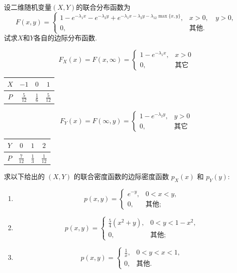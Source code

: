 \documentclass[../main.tex]{subfiles}
\begin{document}
\begin{exercise}{}{}
设二维随机变量$(X,Y)$的联合分布函数为
\[
F(x,y) =
\begin{cases}
1 - e^{-\lambda_1 x} - e^{-\lambda_2 y} + e^{-\lambda_1 x - \lambda_2 y - \lambda_{12} \max\{x,y\}}, & x > 0, \quad y > 0, \\
0, & \text{其他}.
\end{cases}
\]
试求$X$和$Y$各自的边际分布函数.
\end{exercise}
\begin{solution}
    
\[
F_{X}\left( x \right)= F\left( x,\infty \right)= \begin{cases} 1-e^{- \lambda _1 x},&x> 0\\ 
 0,&\text{其它} \end{cases}   
\]\begin{center}
\begin{tabular}{|c|c|c|c|}
\hline
\(X\) & \(-1\) & \(0\) & \(1\) \\
\hline
\(P\) & \(\frac{5}{12}\) & \(\frac{1}{6}\) & \(\frac{5}{12}\) \\
\hline
\end{tabular}
\end{center}
 \[
F_{Y}\left( x \right)= F\left( \infty,y \right)= \begin{cases} 1-e^{- \lambda _2 y},&y> 0\\ 
 0,&\text{其它} \end{cases}   
\]
\begin{center}
\begin{tabular}{|c|c|c|c|}
\hline
\(Y\) & \(0\) & \(1\) & \(2\) \\
\hline
\(P\) & \(\frac{7}{12}\) & \(\frac{1}{3}\) & \(\frac{1}{12}\) \\
\hline
\end{tabular}
\end{center}

\end{solution}

\begin{exercise}{}{}
求以下给出的 $(X,Y)$ 的联合密度函数的边际密度函数 $p_X(x)$ 和 $p_Y(y)$:
\begin{enumerate}
\item \[p(x,y) = \begin{cases} e^{-y}, & 0 < x < y, \\ 0, & \text{其他}; \end{cases}\]
\item \[p(x,y) = \begin{cases} \frac{5}{4}(x^2 + y), & 0 < y < 1 - x^2, \\ 0, & \text{其他}; \end{cases}\]
\item \[p(x,y) = \begin{cases} \frac{1}{x}, & 0<y<x<1, \\ 0, & \text{其他}. \end{cases}\]
\end{enumerate}
\end{exercise}
\end{document}

